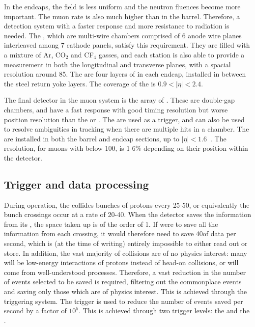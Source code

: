 In the endcaps, the field is less uniform and the neutron fluences become more important. The muon rate is also much higher than in the barrel. Therefore, a detection system with a faster response and more resistance to radiation is needed. The \CSCs, which are multi-wire chambers comprised of 6 anode wire planes interleaved among 7 cathode panels, satisfy this requirement. They are filled with a mixture of Ar, CO$_{2}$ and CF$_{4}$ gasses, and each station is also able to provide a measurement in both the longitudinal and transverse planes, with a spacial resolution around 85\um. The are four layers of \CSCs in each endcap, installed in between the steel return yoke layers. The coverage of the \CSCs is $0.9<|\eta|<2.4$.

The final detector in the muon system is the array of \RPCs. These are double-gap chambers, and have a fast response with good timing resolution but worse position resolution than the \DTs or \CSCs. The \RPCs are used as a trigger, and can also be used to resolve ambiguities in tracking when there are multiple hits in a chamber. The \RPCs are installed in both the barrel and endcap sections, up to $|\eta|<1.6$~\cite{CMSatLHC,cmsMuon}. The \pT resolution, for muons with \pT below 100\GeV, is 1-6\% depending on their position within the detector.~\cite{MuonReco}

\subsection{Trigger and data processing}
\label{sec:cms:trigger}

During operation, the \LHC collides bunches of protons every 25-50\ns, or equivalently the bunch crossings occur at a rate of 20-40\MHz. When the \CMS detector saves the information from its \subdetector, the space taken up is of the order of 1\MB. If \CMS were to save all the information from each crossing, it would therefore need to save 40\TB of data per second, which is (at the time of writing) entirely impossible to either read out or store. In addition, the vast majority of collisions are of no physics interest: many will be low-energy interactions of protons instead of head-on collisions, or will come from well-understood \SM processes. Therefore, a vast reduction in the number of events selected to be saved is required, filtering out the commonplace events and saving only those which are of physics interest. This is achieved through the \CMS triggering system. The trigger is used to reduce the number of events saved per second by a factor of $10^5$. This is achieved through two trigger levels: the \LI and the \HLT.

